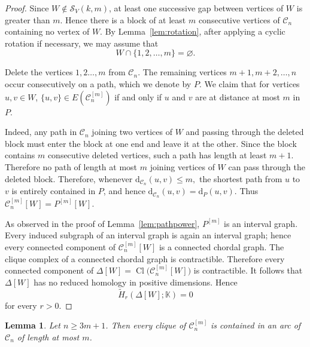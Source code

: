 \documentclass[12pt,reqno]{amsart}
\newtheorem{lemma}[theorem]{Lemma}
\theoremstyle{definition}
\numberwithin{equation}{section}
\def\C{\mathcal{C}}
\def\K{\mathbb{K}}
\begin{document}
\begin{proof}
	Since $W\notin\mathcal{S}_V(k,m)$, at least one successive gap between
	vertices of $W$ is greater than $m$. Hence there is a block of at least
	$m$ consecutive vertices of $\C_n$ containing no vertex of $W$.
	By Lemma~\ref{lem:rotation}, after applying a cyclic rotation if
	necessary, we may assume that
	\[
	W\cap\{1,2,\ldots,m\}=\varnothing.
	\]
	
	Delete the vertices $1,2\ldots,m$ from $\C_n$. The remaining vertices \( m+1,m+2,\ldots,n \)
	occur consecutively on a path, which we denote by $P$. We claim that
	for vertices $u,v\in W$, \( \{u,v\}\in E(\C_n^{[m]}) \)
	if and only if $u$ and $v$ are at distance at most $m$ in $P$.
	
	Indeed, any path in $\C_n$ joining two vertices of $W$ and passing
	through the deleted block must enter the block at one end and leave it
	at the other. Since the block contains $m$ consecutive deleted
	vertices, such a path has length at least $m+1$. Therefore no path of
	length at most $m$ joining vertices of $W$ can pass through the deleted
	block. Therefore, whenever \( \mathrm{d}_{\C_n}(u,v)\leq m, \)
	the shortest path from $u$ to $v$ is entirely contained in $P$, and
	hence \( 	\mathrm{d}_{\C_n}(u,v)=\mathrm{d}_P(u,v). \)
	Thus \( \C_n^{[m]}[W]=P^{[m]}[W]. \)
	
	As observed in the proof of Lemma~\ref{lem:pathpower},
	$P^{[m]}$ is an interval graph.
	Every induced subgraph of an interval graph is again an interval graph;
	hence every connected component of $\C_n^{[m]}[W]$ is a connected
	chordal graph. The clique complex of a connected chordal graph is
	contractible. Therefore every connected component of \( \Delta[W]
	=
	\operatorname{Cl}\bigl(\C_n^{[m]}[W]\bigr) \)
	is contractible. It follows that $\Delta[W]$ has no reduced homology in positive
	dimensions. Hence
	\[
	\widetilde H_r(\Delta[W];\K)=0
	\]
	for every \(r>0\).
\end{proof}


\begin{lemma}\label{lem:arc}
	Let $n\geq3m+1$. Then every clique of $\C_n^{[m]}$ is contained in an
	arc of $\C_n$ of length at most $m$.
\end{lemma}
\end{document}
